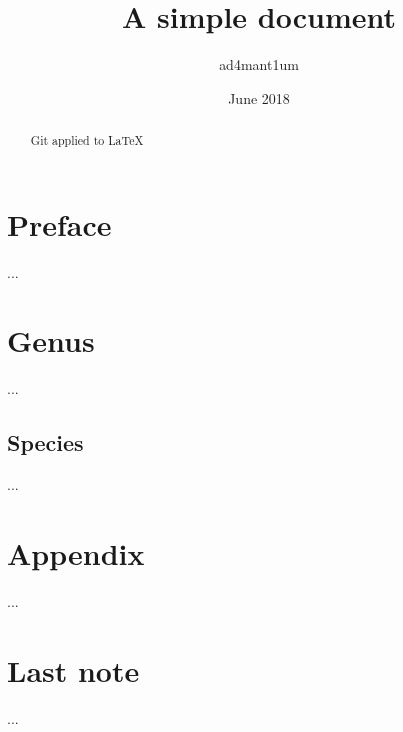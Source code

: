 \documentclass{book}
\begin{document}
\frontmatter
\title{A simple document}
\author{ad4mant1um}
\date{June 2018}
\maketitle

\begin{abstract}
  Git applied to \LaTeX
\end{abstract}

\tableofcontents
\chapter{Preface}
...

\mainmatter
\chapter{Genus}
...
\section{Species}
...

\appendix
\chapter{Appendix}
...

\backmatter
\chapter{Last note}
...
\end{document}
